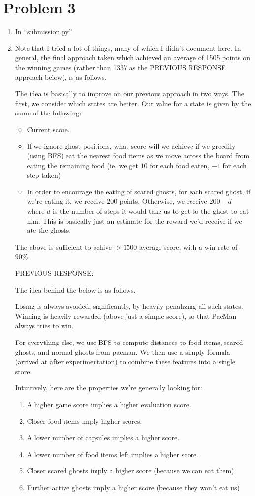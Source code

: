 \documentclass[12pt]{article}
\begin{document}
\section*{Problem 3}
\begin{enumerate}[label=(\alph*)]
  \item In ``submission.py''
  \item Note that I tried a lot of things, many of which I didn't document here. In general, the final approach taken which achieved an average of 1505 points on the winning games (rather than 1337 as the PREVIOUS RESPONSE approach below), is as follows.

  The idea is basically to improve on our previous approach in two ways. The first, we consider which states are better. Our value for a state is given by the sume of the following:
  \begin{itemize}
    \item Current score.
    \item If we ignore ghost positions, what score will we achieve if we greedily (using BFS) eat the nearest food items as we move across the board from eating the remaining food (ie, we get $10$ for each food eaten, $-1$ for each step taken)
    \item In order to encourage the eating of scared ghosts, for each scared ghost, if we're eating it, we receive $200$ points. Otherwise, we receive $200 -d$ where $d$ is the number of steps it would take us to get to the ghost to eat him. This is basically just an estimate for the reward we'd receive if we ate the ghosts.
  \end{itemize}

  The above is sufficient to achive $>1500$ average score, with a win rate of $90\%$.


  PREVIOUS RESPONSE:

  The idea behind the below is as follows.

    Losing is always avoided, significantly, by heavily penalizing all such states.
    Winning is heavily rewarded (above just a simple score), so that PacMan always tries to win.

    For everything else, we use BFS to compute distances to food items, scared ghosts, and
    normal ghosts from pacman. We then use a simply formula (arrived at after experimentation)
    to combine these features into a single store.

    Intuitively, here are the properties we're generally looking for:
    \begin{enumerate}
      \item A higher game score implies a higher evaluation score.
      \item Closer food items imply higher scores.
      \item A lower number of capsules implies a higher score.
      \item A lower number of food items left implies a higher score.
      \item Closer scared ghosts imply a higher score (because we can eat them)
      \item Further active ghosts imply a higher score (because they won't eat us)
    \end{enumerate}
\end{enumerate}
\end{document}
